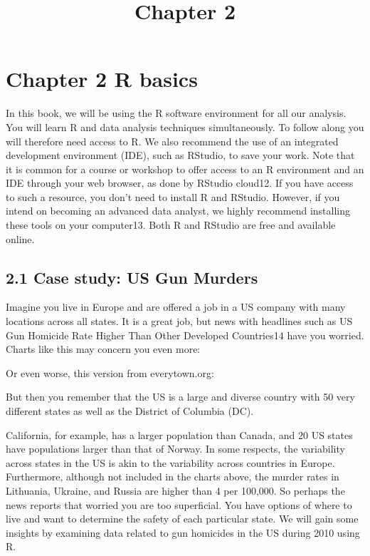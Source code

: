 \documentclass[
]{article}
\title{Chapter 2}
\author{}
\date{\vspace{-2.5em}}
\begin{document}
\maketitle

\hypertarget{chapter-2-r-basics}{%
\section{Chapter 2 R basics}\label{chapter-2-r-basics}}

In this book, we will be using the R software environment for all our
analysis. You will learn R and data analysis techniques simultaneously.
To follow along you will therefore need access to R. We also recommend
the use of an integrated development environment (IDE), such as RStudio,
to save your work. Note that it is common for a course or workshop to
offer access to an R environment and an IDE through your web browser, as
done by RStudio cloud12. If you have access to such a resource, you
don't need to install R and RStudio. However, if you intend on becoming
an advanced data analyst, we highly recommend installing these tools on
your computer13. Both R and RStudio are free and available online.

\hypertarget{case-study-us-gun-murders}{%
\subsection{2.1 Case study: US Gun
Murders}\label{case-study-us-gun-murders}}

Imagine you live in Europe and are offered a job in a US company with
many locations across all states. It is a great job, but news with
headlines such as US Gun Homicide Rate Higher Than Other Developed
Countries14 have you worried. Charts like this may concern you even
more:

Or even worse, this version from everytown.org:

But then you remember that the US is a large and diverse country with 50
very different states as well as the District of Columbia (DC).

California, for example, has a larger population than Canada, and 20 US
states have populations larger than that of Norway. In some respects,
the variability across states in the US is akin to the variability
across countries in Europe. Furthermore, although not included in the
charts above, the murder rates in Lithuania, Ukraine, and Russia are
higher than 4 per 100,000. So perhaps the news reports that worried you
are too superficial. You have options of where to live and want to
determine the safety of each particular state. We will gain some
insights by examining data related to gun homicides in the US during
2010 using R.
\end{document}
